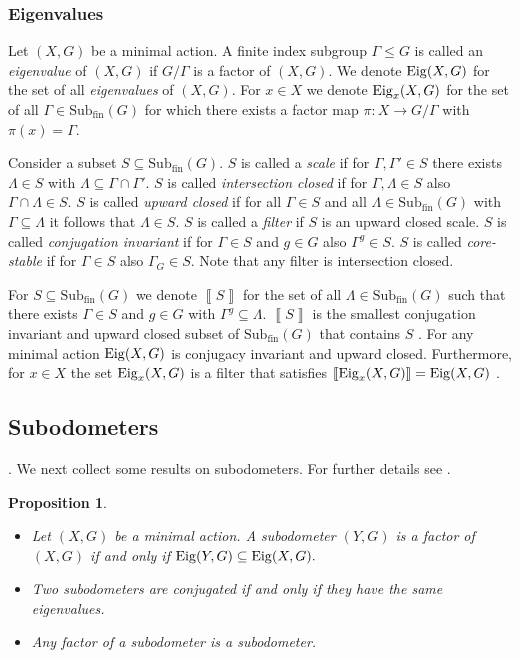 \documentclass[12pt, reqno]{amsart}
\newtheorem{proposition}[theorem]{Proposition}
\theoremstyle{definition}
\theoremstyle{remark}
\numberwithin{equation}{section}
\theoremstyle{theorem}
\theoremstyle{remark}
\def\subfin{{\operatorname{Sub_{fin}}}}
\def\Eig{{\rm Eig}}
\newcommand{\eigenhull}[1]{\left\llbracket #1 \right\rrbracket}
\begin{document}
\subsubsection{Eigenvalues}
\label{subsubsec:prelims_actions_Eigenvalues}
Let $(X,G)$ be a minimal action. 
A finite index subgroup $\Gamma\leq G$ is called an \emph{eigenvalue} of $(X,G)$ if $G/\Gamma$ is a factor of $(X,G)$. We denote $\Eig(X,G)$ for the set of all \emph{eigenvalues} of $(X,G)$. 
For $x\in X$ we denote $\Eig_x(X,G)$ for the set of all $\Gamma\in \subfin(G)$ for which there exists a factor map $\pi\colon X\to G/\Gamma$ with $\pi(x)=\Gamma$.

Consider a subset $S\subseteq \subfin(G)$. 
$S$ is called a \emph{scale} if for $\Gamma,\Gamma'\in S$ there exists $\Lambda\in S$ with $\Lambda\subseteq \Gamma\cap \Gamma'$. 
$S$ is called \emph{intersection closed} if for $\Gamma,\Lambda\in S$ also $\Gamma\cap \Lambda\in S$. 
$S$ is called \emph{upward closed} if for all $\Gamma\in S$ and all $\Lambda\in \subfin(G)$ with $\Gamma\subseteq \Lambda$ it follows that $\Lambda\in S$. 
$S$ is called a \emph{filter} if $S$ is an upward closed scale. 
$S$ is called \emph{conjugation invariant} if for $\Gamma\in S$ and $g\in G$ also $\Gamma^g\in S$.
$S$ is called \emph{core-stable} if for $\Gamma\in S$ also $\Gamma_G\in S$. 
Note that any filter is intersection closed. 

For $S\subseteq \subfin(G)$ we denote $\eigenhull{S}$ for the set of all $\Lambda\in \subfin(G)$ such that there exists $\Gamma\in S$ and $g\in G$ with $\Gamma^g\subseteq \Lambda$. $\eigenhull{S}$ is the smallest conjugation invariant and upward closed subset of $\subfin(G)$ that contains $S$ \cite[Remark~5.12]{cortez2026minimal}. 
For any minimal action $\Eig(X,G)$ is conjugacy invariant and upward closed. 
Furthermore, for $x\in X$ the set $\Eig_x(X,G)$ is a filter that satisfies $\eigenhull{\Eig_x(X,G)}=\Eig(X,G)$ \cite[Theorem 4.7 and Proposition~5.13]{cortez2026minimal}.



\subsection{Subodometers}
\label{subsec:prelims_subodometers}. 
We next collect some results on subodometers. 
For further details see \cite{cortez2026minimal}. 

\begin{proposition}\cite[Proposition~5.1 and Theorem~5.5]{cortez2026minimal}
\label{pro:EIGfactorsAndConjugacyInvariant}
    \begin{itemize}
        \item[(i)] Let $(X,G)$ be a minimal action. 
        A subodometer $(Y,G)$ is a factor of $(X,G)$ if and only if $\Eig(Y,G)\subseteq \Eig(X,G).$
        \item[(ii)] Two subodometers are conjugated if and only if they have the same eigenvalues. 
        \item[(iii)] Any factor of a subodometer is a subodometer. 
    \end{itemize}     
\end{proposition}
\end{document}
